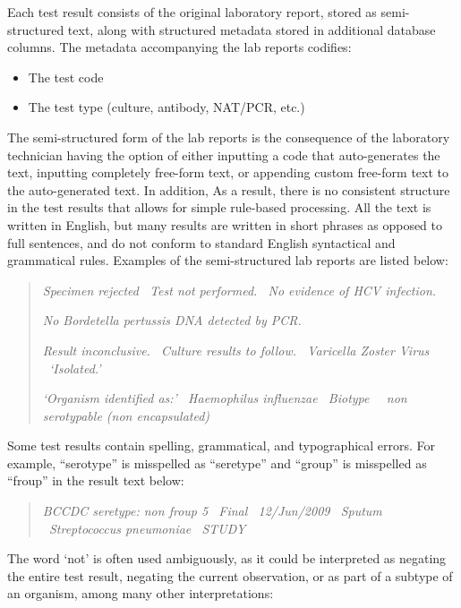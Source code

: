 \documentclass[12pt]{article}
\begin{document}
Each test result consists of the original laboratory report, stored as semi-structured text, along with structured metadata stored in additional database columns. The metadata accompanying the lab reports codifies:

\begin{itemize}
    \item The test code
    \item The test type (culture, antibody, NAT/PCR, etc.)
\end{itemize}

The semi-structured form of the lab reports is the consequence of the laboratory technician having the option of either inputting a code that auto-generates the text, inputting completely free-form text, or appending custom free-form text to the auto-generated text. In addition, As a result, there is no consistent structure in the test results that allows for simple rule-based processing. All the text is written in English, but many results are written in short phrases as opposed to full sentences, and do not conform to standard English syntactical and grammatical rules. Examples of the semi-structured lab reports are listed below:

\begin{quote}
    \textit{Specimen rejected \textbar\ Test not performed. \textbar\ No evidence of HCV infection.}
    
    \textit{No Bordetella pertussis DNA detected by PCR.}
    
    \textit{Result inconclusive. \textbar\ Culture results to follow. \textbar\ Varicella Zoster Virus \textbar\ `Isolated.'}
    
    \textit{`Organism identified as:' \textbar\ Haemophilus influenzae \textbar\ Biotype \textbar\ \textbar\ non serotypable (non encapsulated)}
\end{quote}

Some test results contain spelling, grammatical, and typographical errors. For example, ``serotype'' is misspelled as ``seretype'' and ``group'' is misspelled as ``froup'' in the result text below:

\begin{quote}
    \textit{BCCDC seretype: non froup 5 \textbar\ Final \textbar\ 12/Jun/2009 \textbar\ Sputum \textbar\ Streptococcus pneumoniae \textbar\ STUDY}
\end{quote}

The word `not' is often used ambiguously, as it could be interpreted as negating the entire test result, negating the current observation, or as part of a subtype of an organism, among many other interpretations:
\end{document}
